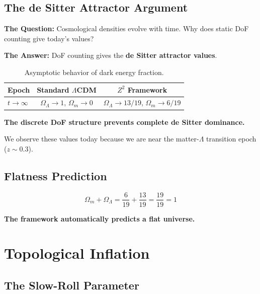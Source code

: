 \documentclass[12pt,a4paper]{article}
\newcommand{\OmegaL}{\Omega_\Lambda}
\newcommand{\OmegaM}{\Omega_m}
\newcommand{\Zsq}{Z^2}
\begin{document}
\subsection{The de Sitter Attractor Argument}

\textbf{The Question:} Cosmological densities evolve with time. Why does static DoF counting give today's values?

\textbf{The Answer:} DoF counting gives the \textbf{de Sitter attractor values}.

\begin{table}[H]
\centering
\begin{tabular}{lcc}
\toprule
\textbf{Epoch} & \textbf{Standard $\Lambda$CDM} & \textbf{$\Zsq$ Framework} \\
\midrule
$t \to \infty$ & $\OmegaL \to 1$, $\OmegaM \to 0$ & $\OmegaL \to 13/19$, $\OmegaM \to 6/19$ \\
\bottomrule
\end{tabular}
\caption{Asymptotic behavior of dark energy fraction.}
\end{table}

\textbf{The discrete DoF structure prevents complete de Sitter dominance.}

We observe these values today because we are near the matter-$\Lambda$ transition epoch ($z \sim 0.3$).

\subsection{Flatness Prediction}

\begin{equation}
\OmegaM + \OmegaL = \frac{6}{19} + \frac{13}{19} = \frac{19}{19} = 1
\end{equation}

\textbf{The framework automatically predicts a flat universe.}

\section{Topological Inflation}
\label{sec:inflation}

\subsection{The Slow-Roll Parameter}
\end{document}
